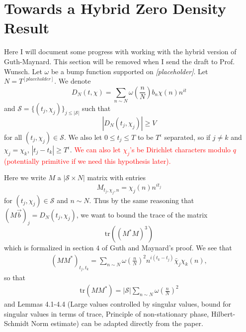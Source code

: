 \section{Towards a Hybrid Zero Density Result}

Here I will document some progress with working with
the hybrid version of Guth-Maynard. This section will be removed when I send the draft to Prof. Wunsch.
Let $\omega$ be a bump function supported on \textit{[placeholder]}. Let $N=T^{[placeholder]}$. We denote \[
D_N(t,\chi) = \sum_{n\sim N} \omega\left(\frac{n}{N}\right)b_n \chi(n) n^{it}
\]
and $\mathcal{S}=\{(t_j,\chi_j)\}_{j\leq |\mathcal{S}|}$ such that 
\[
    |D_N(t_j,\chi_j)|\geq V
\]
for all $(t_j,\chi_j)\in\mathcal{S}$.
We also let $0\leq t_j\leq T$ to be $T^\epsilon$ separated, so if 
$j\neq k$ and $\chi_j=\chi_k$, $|t_j-t_k|\geq T^\epsilon$. \textcolor{red}{We can also
let $\chi_j$'s be Dirichlet characters modulo $q$ (potentially primitive if we need this hypothesis later).}

Here we write $M$ a $|\mathcal{S}\times N|$ matrix with entries
\[
    M_{t_j,\chi_j,n} = \chi_j(n)n^{it_j}
\]
for $(t_j,\chi_j)\in\mathcal{S}$ and $n\sim N$.
Thus by the same reasoning that $(M\vec{b})_j=D_N(t_j,\chi_j)$,
we want to bound the trace of the matrix \[
\textrm{tr}((M^*M)^3)
\]
which is formalized in section $4$ of Guth and Maynard's proof.
We see that \begin{align*}
    (MM^*)_{t_j,t_k} = \sum_{n\sim N} \omega\left(\frac{n}{N}\right)^2 n^{i(t_k-t_j)}\bar{\chi}_j\chi_k(n),
\end{align*}
so that \begin{align*}
    \textrm{tr}(MM^*) = |\mathcal{S}|\sum_{n\sim N} \omega\left(\frac{n}{N}\right)^2
\end{align*}
and Lemmas 4.1-4.4 (Large values controlled by singular values, bound for singular values in terms of trace,
Principle of non-stationary phase, Hilbert-Schmidt Norm estimate) can be adapted directly from the paper.

